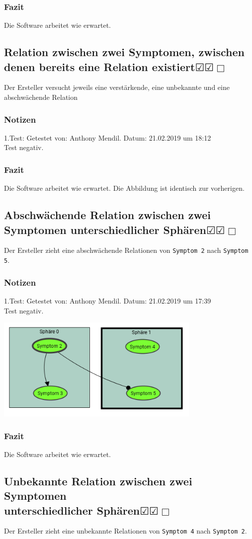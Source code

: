 \documentclass{scrartcl}
\newcommand{\subsectiont}[2]{\subsection[#1]{#1{\normalsize\normalfont #2}}}
\newcommand{\leer}{$\Box$}
\newcommand{\ok}{$\CheckedBox$}
\begin{document}
\subsubsection{Fazit}
Die Software arbeitet wie erwartet.

\subsectiont{Relation zwischen zwei Symptomen, zwischen denen bereits eine Relation existiert}{\dotfill\ok\ok\leer}
Der Ersteller versucht jeweils eine verstärkende, eine unbekannte und eine abschwächende Relation 
\subsubsection{Notizen}
1.Test: Getestet von: Anthony Mendil. Datum: 21.02.2019 um 18:12 \\
Test negativ.
\subsubsection{Fazit}
Die Software arbeitet wie erwartet. Die Abbildung ist identisch zur vorherigen.

\subsectiont{Abschwächende Relation zwischen zwei Symptomen unterschiedlicher Sphären}{\dotfill\ok\ok\leer}
Der Ersteller zieht eine abschwächende Relationen von \texttt{Symptom 2} nach \texttt{Symptom 5}. 
\subsubsection{Notizen}
1.Test: Getestet von: Anthony Mendil. Datum: 21.02.2019 um 17:39 \\
Test negativ.
\begin{center}
\includegraphics[height=5cm]{1_10.PNG}
\end{center}
\subsubsection{Fazit}
Die Software arbeitet wie erwartet.

\subsectiont{Unbekannte Relation zwischen zwei Symptomen\\ unterschiedlicher Sphären}{\dotfill\ok\ok\leer}
Der Ersteller zieht eine unbekannte Relationen von \texttt{Symptom 4} nach \texttt{Symptom 2}. 
\end{document}
